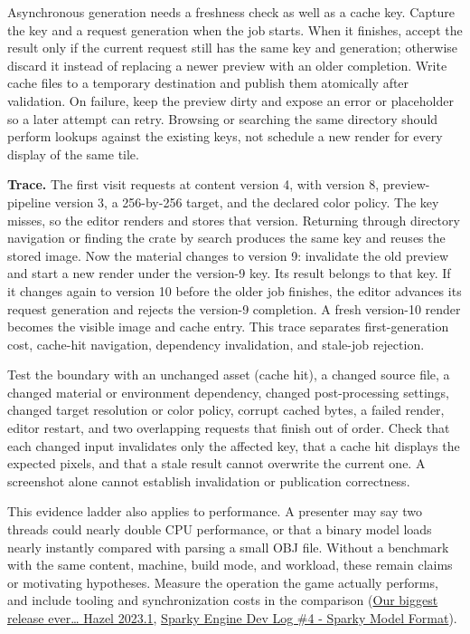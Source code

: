 Asynchronous generation needs a freshness check as well as a cache key. Capture the key and a request generation when the job starts. When it finishes, accept the result only if the current request still has the same key and generation; otherwise discard it instead of replacing a newer preview with an older completion. Write cache files to a temporary destination and publish them atomically after validation. On failure, keep the preview dirty and expose an error or placeholder so a later attempt can retry. Browsing or searching the same directory should perform lookups against the existing keys, not schedule a new render for every display of the same tile.

\textbf{Trace.} The first visit requests  at content version 4, with  version 8, preview-pipeline version 3, a 256-by-256 target, and the declared color policy. The key misses, so the editor renders and stores that version. Returning through directory navigation or finding the crate by search produces the same key and reuses the stored image. Now the material changes to version 9: invalidate the old preview and start a new render under the version-9 key. Its result belongs to that key. If it changes again to version 10 before the older job finishes, the editor advances its request generation and rejects the version-9 completion. A fresh version-10 render becomes the visible image and cache entry. This trace separates first-generation cost, cache-hit navigation, dependency invalidation, and stale-job rejection.

Test the boundary with an unchanged asset (cache hit), a changed source file, a changed material or environment dependency, changed post-processing settings, changed target resolution or color policy, corrupt cached bytes, a failed render, editor restart, and two overlapping requests that finish out of order. Check that each changed input invalidates only the affected key, that a cache hit displays the expected pixels, and that a stale result cannot overwrite the current one. A screenshot alone cannot establish invalidation or publication correctness.

This evidence ladder also applies to performance. A presenter may say two threads could nearly double CPU performance, or that a binary model loads nearly instantly compared with parsing a small OBJ file. Without a benchmark with the same content, machine, build mode, and workload, these remain claims or motivating hypotheses. Measure the operation the game actually performs, and include tooling and synchronization costs in the comparison (\href{https://www.youtube.com/watch?v=L_XLGmG2Ct8&t=1m12s}{Our biggest release ever\ldots{} Hazel 2023.1}, \href{https://www.youtube.com/watch?v=EUy8G3uMitI&t=4m30s}{Sparky Engine Dev Log \#4 - Sparky Model Format}).

